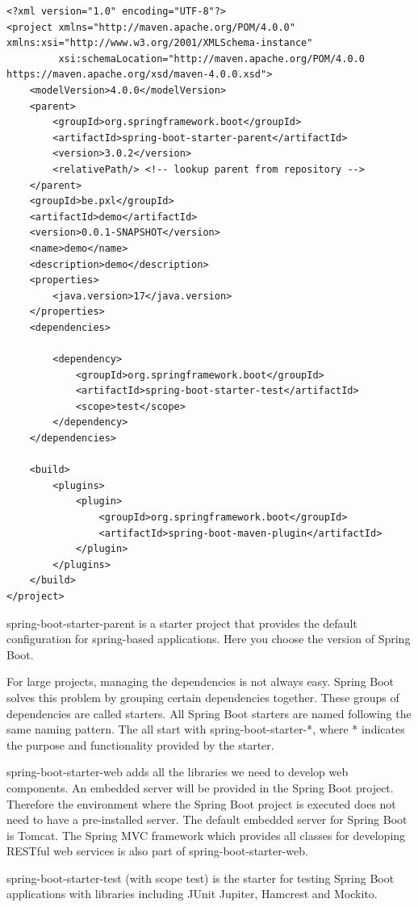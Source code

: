 \begin{lstlisting}[frame=single]
<?xml version="1.0" encoding="UTF-8"?>
<project xmlns="http://maven.apache.org/POM/4.0.0" xmlns:xsi="http://www.w3.org/2001/XMLSchema-instance"
         xsi:schemaLocation="http://maven.apache.org/POM/4.0.0 https://maven.apache.org/xsd/maven-4.0.0.xsd">
    <modelVersion>4.0.0</modelVersion>
    <parent>
        <groupId>org.springframework.boot</groupId>
        <artifactId>spring-boot-starter-parent</artifactId>
        <version>3.0.2</version>
        <relativePath/> <!-- lookup parent from repository -->
    </parent>
    <groupId>be.pxl</groupId>
    <artifactId>demo</artifactId>
    <version>0.0.1-SNAPSHOT</version>
    <name>demo</name>
    <description>demo</description>
    <properties>
        <java.version>17</java.version>
    </properties>
    <dependencies>

        <dependency>
            <groupId>org.springframework.boot</groupId>
            <artifactId>spring-boot-starter-test</artifactId>
            <scope>test</scope>
        </dependency>
    </dependencies>

    <build>
        <plugins>
            <plugin>
                <groupId>org.springframework.boot</groupId>
                <artifactId>spring-boot-maven-plugin</artifactId>
            </plugin>
        </plugins>
    </build>
</project>
\end{lstlisting}

spring-boot-starter-parent is a starter project that provides the default configuration for spring-based applications. Here you choose the version of Spring Boot.

For large projects, managing the dependencies is not always easy. Spring Boot solves this problem by grouping certain dependencies together. These groups of dependencies are called starters. All Spring Boot starters are named following the same naming pattern. The all start with spring-boot-starter-*, where * indicates the purpose and functionality provided by the starter.

spring-boot-starter-web adds all the libraries we need to develop web components. An embedded server will be provided in the Spring Boot project. Therefore the environment where the Spring Boot project is executed does not need to have a pre-installed server. The default embedded server for Spring Boot is Tomcat. The Spring MVC framework which provides all classes for developing RESTful web services is also part of spring-boot-starter-web.

spring-boot-starter-test (with scope test) is the starter for testing Spring Boot applications with libraries including JUnit Jupiter, Hamcrest and Mockito.

